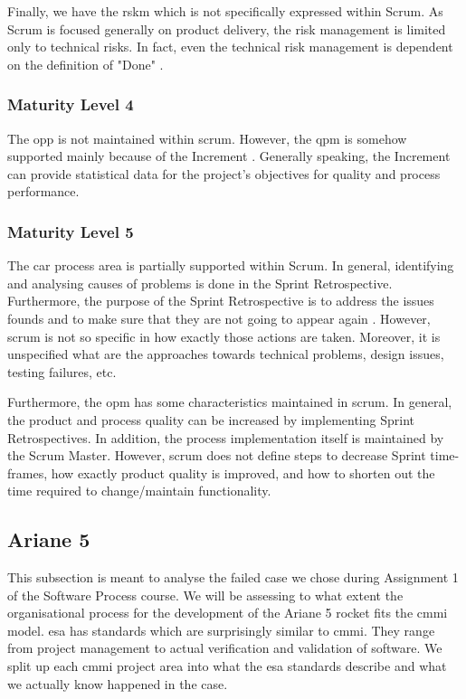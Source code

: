 Finally, we have the \ac{rskm} which is not specifically expressed within Scrum. As Scrum is focused generally on product delivery, the risk management is limited only to technical risks. In fact, even the technical risk management is dependent on the definition of "Done" \citep{schwaber2011scrum}.

\subsubsection{Maturity Level 4}
The \ac{opp} is not maintained within \ac{scrum}. However, the \ac{qpm} is somehow supported mainly because of the Increment \citep[page 15]{schwaber2011scrum}. Generally speaking, the Increment can provide statistical data for the project’s objectives for quality and process performance.

\subsubsection{Maturity Level 5}
The \ac{car} process area is partially supported within Scrum. In general, identifying and analysing causes of problems is done in the Sprint Retrospective. Furthermore, the purpose of the Sprint Retrospective is to address the issues founds and to make sure that they are not going to appear again \citep[page 12]{schwaber2011scrum}. However, \ac{scrum} is not so specific in how exactly those actions are taken. Moreover, it is unspecified what are the approaches towards technical problems, design issues, testing failures, etc. 

Furthermore, the \ac{opm} has some characteristics maintained in \ac{scrum}. In general, the product and process quality can be increased by implementing Sprint Retrospectives. In addition, the process implementation itself is maintained by the Scrum Master. However, \ac{scrum} does not define steps to decrease Sprint time-frames, how exactly product quality is improved, and how to shorten out the time required to change/maintain functionality.

\subsection{Ariane 5}
This subsection is meant to analyse the failed case we chose during Assignment 1 of the Software Process course.
We will be assessing to what extent the organisational process for the development of the Ariane 5 rocket fits the \ac{cmmi} model. \ac{esa} has standards \citep{esaSEstandards1991} which are surprisingly similar to \ac{cmmi}. They range from project management to actual verification and validation of software. We split up each \ac{cmmi} project area into what the \ac{esa} standards describe and what we actually know happened in the case.

